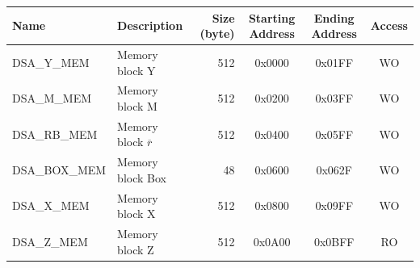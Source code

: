 \begin{longtable}{ | p{3cm} | p{3cm} | r | c | c | c | }
\hline
\rowcolor{lightgray}
Name & Description &  Size (byte) & Starting Address & Ending Address & Access \\ \hline
{DSA\_Y\_MEM}\label{DSAYMEM}  & Memory block Y  & 512  & 0x0000 & 0x01FF & WO \\ \hline
{DSA\_M\_MEM}\label{DSAMMEM}  & Memory block M  & 512  & 0x0200 & 0x03FF & WO \\ \hline
{DSA\_RB\_MEM}\label{DSARBMEM}  & Memory block $\overline{r}$  & 512  & 0x0400 & 0x05FF & WO \\ \hline
{DSA\_BOX\_MEM}\label{DSABOXMEM}  & Memory block Box  & 48  & 0x0600 & 0x062F & WO \\ \hline
{DSA\_X\_MEM}\label{DSAXMEM}  & Memory block X  & 512  & 0x0800 & 0x09FF & WO \\ \hline
{DSA\_Z\_MEM}\label{DSAZMEM}  & Memory block Z  & 512  & 0x0A00 & 0x0BFF & RO \\ \hline
\end{longtable}
